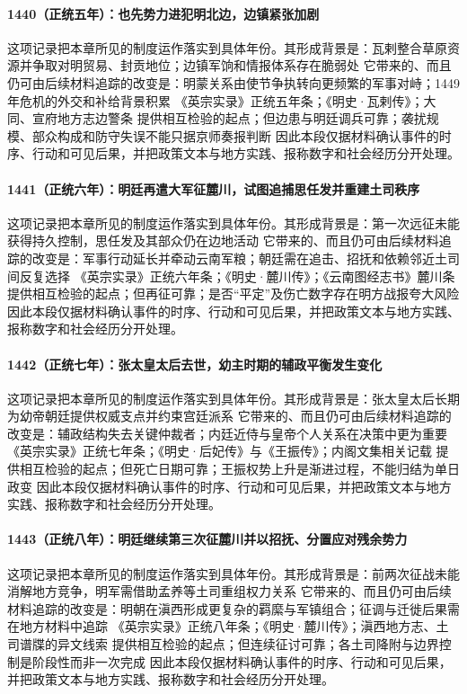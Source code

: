 \paragraph{1440（正统五年）：也先势力进犯明北边，边镇紧张加剧} 这项记录把本章所见的制度运作落实到具体年份。其形成背景是：瓦剌整合草原资源并争取对明贸易、封贡地位；边镇军饷和情报体系存在脆弱处 它带来的、而且仍可由后续材料追踪的改变是：明蒙关系由使节争执转向更频繁的军事对峙；1449年危机的外交和补给背景积累 《英宗实录》正统五年条；《明史·瓦剌传》；大同、宣府地方志边警条 提供相互检验的起点；但边患与明廷调兵可靠；袭扰规模、部众构成和防守失误不能只据京师奏报判断 因此本段仅据材料确认事件的时序、行动和可见后果，并把政策文本与地方实践、报称数字和社会经历分开处理。

\paragraph{1441（正统六年）：明廷再遣大军征麓川，试图追捕思任发并重建土司秩序} 这项记录把本章所见的制度运作落实到具体年份。其形成背景是：第一次远征未能获得持久控制，思任发及其部众仍在边地活动 它带来的、而且仍可由后续材料追踪的改变是：军事行动延长并牵动云南军粮；朝廷需在追击、招抚和依赖邻近土司间反复选择 《英宗实录》正统六年条；《明史·麓川传》；《云南图经志书》麓川条 提供相互检验的起点；但再征可靠；是否“平定”及伤亡数字存在明方战报夸大风险 因此本段仅据材料确认事件的时序、行动和可见后果，并把政策文本与地方实践、报称数字和社会经历分开处理。

\paragraph{1442（正统七年）：张太皇太后去世，幼主时期的辅政平衡发生变化} 这项记录把本章所见的制度运作落实到具体年份。其形成背景是：张太皇太后长期为幼帝朝廷提供权威支点并约束宫廷派系 它带来的、而且仍可由后续材料追踪的改变是：辅政结构失去关键仲裁者；内廷近侍与皇帝个人关系在决策中更为重要 《英宗实录》正统七年条；《明史·后妃传》与《王振传》；内阁文集相关记载 提供相互检验的起点；但死亡日期可靠；王振权势上升是渐进过程，不能归结为单日政变 因此本段仅据材料确认事件的时序、行动和可见后果，并把政策文本与地方实践、报称数字和社会经历分开处理。

\paragraph{1443（正统八年）：明廷继续第三次征麓川并以招抚、分置应对残余势力} 这项记录把本章所见的制度运作落实到具体年份。其形成背景是：前两次征战未能消解地方竞争，明军需借助孟养等土司重组权力关系 它带来的、而且仍可由后续材料追踪的改变是：明朝在滇西形成更复杂的羁縻与军镇组合；征调与迁徙后果需在地方材料中追踪 《英宗实录》正统八年条；《明史·麓川传》；滇西地方志、土司谱牒的异文线索 提供相互检验的起点；但连续征讨可靠；各土司降附与边界控制是阶段性而非一次完成 因此本段仅据材料确认事件的时序、行动和可见后果，并把政策文本与地方实践、报称数字和社会经历分开处理。

